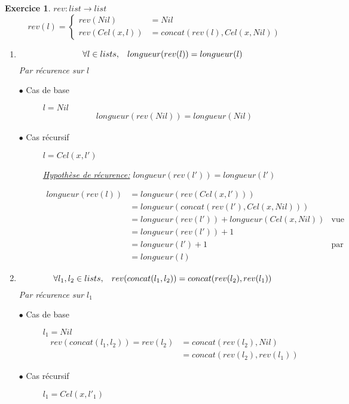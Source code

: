 \documentclass{article}
\theoremstyle{plain}
\newtheorem{exo}{Exercice}%
\begin{document}
\newpage

\begin{exo} \hspace{1,8cm}
    $rev : list \rightarrow  list $
    \[ rev(l) =
        \begin{cases}
        rev(Nil) &= Nil \\
        rev(Cel(x, l)) &= concat(rev(l), Cel(x, Nil))
        \end{cases}
    \]

\begin{enumerate}
\item 
    \begin{equation*}
        \forall l \in lists,\hspace{3mm} 
        longueur(rev(l)) = longueur(l) 
    \end{equation*}
    Par récurence sur $l$
    \begin{description}
    \item[$\bullet$ Cas de base] $l = Nil$
        \begin{align*} 
            longueur(rev(Nil)) = longueur(Nil) 
        \end{align*}
    \item[$\bullet$ Cas récursif] $l = Cel(x, l')$ 
                
        \underline{Hypothèse de récurence:} $longueur(rev(l')) = longueur(l')$
                
        \begin{align*}
            longueur(rev(l)) 
                &= longueur(rev(Cel(x, l')))\\
                &= longueur(concat(rev(l'), Cel(x, Nil))) \\
                &= longueur(rev(l')) + longueur(Cel(x, Nil)) & \textrm{vue ex(1.3)}\\
                &= longueur(rev(l')) + 1 \\
                &= longueur(l') + 1 & \textrm{par HP}\\
                &= longueur(l)
        \end{align*}
    \end{description}

\item 
    \begin{equation*}
        \forall l_1, l_2 \in lists,\hspace{3mm} 
        rev(concat(l_1,l_2)) = concat(rev(l_2),rev(l_1)) 
    \end{equation*}
    Par récurence sur $l_1$
    \begin{description}
    \item[$\bullet$ Cas de base] $l_1 = Nil$
        \begin{align*} 
            rev(concat(l_1,l_2)) = rev(l_2) &= concat(rev(l_2), Nil) \\
                                            &= concat(rev(l_2), rev(l_1))
        \end{align*}
    \item[$\bullet$ Cas récursif] $l_1 = Cel(x, l'_1)$ 
                

\end{description}
\end{enumerate}
\end{exo}
\end{document}
